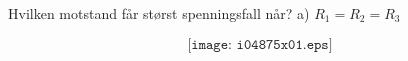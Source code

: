 

Hvilken motstand får størst spenningsfall når?
\vskip 10pt
a) $R_1=R_2=R_3$
\vskip 10pt

$$\texttt{[image: i04875x01.eps]}$$




















